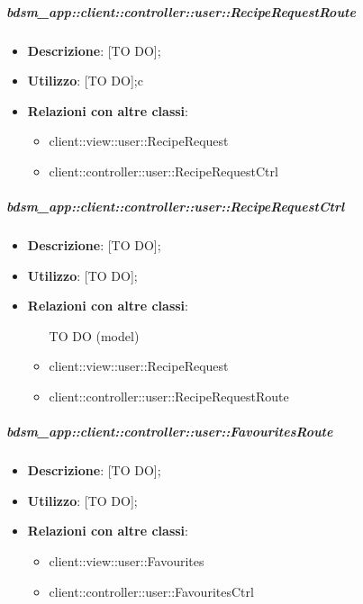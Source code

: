 		\subparagraph{bdsm\_app::client::controller::user::RecipeRequestRoute} %
		\label{subp:bdsm_app_client_controller_user_reciperequestrouteconfig}
			\begin{itemize}
				\item \textbf{Descrizione}: [TO DO];
				\item \textbf{Utilizzo}: [TO DO];c
				\item \textbf{Relazioni con altre classi}:
					\begin{itemize}
						\item client::view::user::RecipeRequest
						\item client::controller::user::RecipeRequestCtrl
					\end{itemize}
			\end{itemize}

		\subparagraph{bdsm\_app::client::controller::user::RecipeRequestCtrl} %
		\label{subp:client_controller_user_reciperequestctrl}
			\begin{itemize}
				\item \textbf{Descrizione}: [TO DO];
				\item \textbf{Utilizzo}: [TO DO];
				\item \textbf{Relazioni con altre classi}:
					\begin{itemize}
						\item [TO DO] (model)
						\item client::view::user::RecipeRequest
						\item client::controller::user::RecipeRequestRoute
					\end{itemize}
			\end{itemize}

		\subparagraph{bdsm\_app::client::controller::user::FavouritesRoute} %
		\label{subp:bdsm_app_client_controller_user_favouritesroute}
			\begin{itemize}
				\item \textbf{Descrizione}: [TO DO];
				\item \textbf{Utilizzo}: [TO DO];
				\item \textbf{Relazioni con altre classi}:
					\begin{itemize}
						\item client::view::user::Favourites
						\item client::controller::user::FavouritesCtrl
					\end{itemize}
			\end{itemize}

